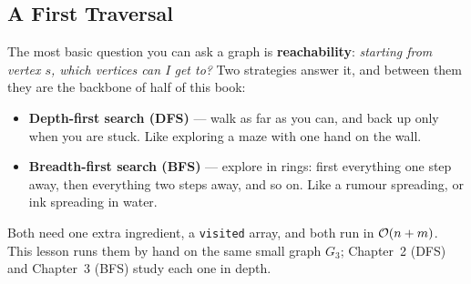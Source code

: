 \subsection{A First Traversal}
\label{ssec:ch1-first-traversal}

The most basic question you can ask a graph is \textbf{reachability}: \emph{starting from vertex $s$, which vertices can I get to?} Two strategies answer it, and between them they are the backbone of half of this book:
\begin{itemize}[leftmargin=*]
    \item \textbf{Depth-first search (DFS)} --- walk as far as you can, and back up only when you are stuck. Like exploring a maze with one hand on the wall.
    \item \textbf{Breadth-first search (BFS)} --- explore in rings: first everything one step away, then everything two steps away, and so on. Like a rumour spreading, or ink spreading in water.
\end{itemize}
Both need one extra ingredient, a \texttt{visited} array, and both run in $\mathcal{O}(n+m)$. This lesson runs them by hand on the same small graph $G_3$; Chapter~2 (DFS) and Chapter~3 (BFS) study each one in depth.


